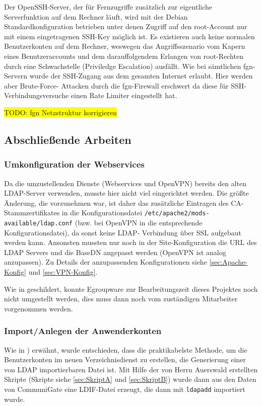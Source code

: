 \documentclass[11pt,a4paper,titlepage=firstiscover,headsepline,bibtotoc]{scrartcl} %
\newcommand{\hilight}[1]{\colorbox{yellow}{#1}} %
\begin{document}
Der OpenSSH-Server, der für Fernzugriffe zusätzlich zur eigentliche Serverfunktion auf dem Rechner läuft, wird mit der Debian Standardkonfiguration betrieben unter denen Zugriff auf den root-Account nur mit einem eingetragenen SSH-Key möglich ist. Es existieren auch keine normalen Benutzerkonten auf dem Rechner, weswegen das Angriffsszenario vom Kapern eines Benutzeraccounts und dem darauffolgendem Erlangen von root-Rechten durch eine Schwachstelle (Priviledge Escalation) ausfällt. Wie bei sämtlichen fgn-Servern wurde der SSH-Zugang aus dem gesamten Internet erlaubt. Hier werden aber Brute-Force- Attacken durch die fgn-Firewall erschwert da diese für SSH-Verbindungsversuche einen Rate Limiter eingestellt hat.

\hilight{TODO: fgn Netzstruktur korrigieren}

\subsection{Abschließende Arbeiten}
\subsubsection{Umkonfiguration der Webservices}
Da die umzustellenden Dienste (Webservices und OpenVPN) bereits den alten LDAP-Server verwenden, musste hier nicht viel eingerichtet werden. Die größte Änderung, die vorzunehmen war, ist daher das zusätzliche Eintragen des CA-Stammzertifikates in die Konfigurationsdatei \texttt{/etc/apache2/mods-available/ldap.conf} (bzw. bei OpenVPN in die entsprechende Konfigurationsdatei), da sonst keine LDAP- Verbindung über SSL aufgebaut werden kann. Ansonsten mussten nur noch in der Site-Konfiguration die URL des LDAP Servers und die BaseDN angepasst werden (OpenVPN ist analog anzupassen). Zu Details der anzupassenden Konfigurationen siehe \autoref{sec:Apache-Konfig} und \autoref{sec:VPN-Konfig}.

Wie in  geschildert, konnte Egroupware zur Bearbeitungszeit dieses Projektes noch nicht umgestellt werden, dies muss dann noch vom zuständigen Mitarbeiter vorgenommen werden.

\subsubsection{Import/Anlegen der Anwenderkonten}
Wie in ) erwähnt, wurde entschieden, dass die praktikabelste Methode, um die Benutzerkonten im neuen Verzeichnisdienst zu erstellen, die Generierung einer von LDAP importierbaren Datei ist. Mit Hilfe der von Herrn Auerswald erstellten Skripte (Skripte siehe \autoref{sec:SkriptA} und \autoref{sec:SkriptB}) wurde dann aus den Daten von CommuniGate eine LDIF-Datei erzeugt, die dann mit \texttt{ldapadd} importiert wurde.
\end{document}

